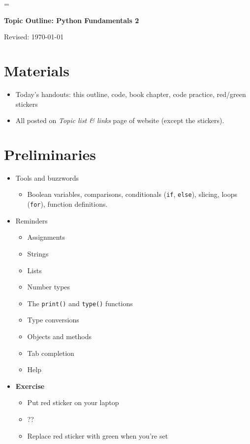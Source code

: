 \documentclass[11pt]{article}
\begin{document}
\parskip=\bigskipamount
\parindent=0.0in
\thispagestyle{empty}


\bigskip\bigskip
\centerline{\Large \bf Topic Outline:  Python Fundamentals 2}
\centerline{Revised: \today}


\section*{Materials}

\begin{itemize}
\item  Today's handouts:  this outline, code, book chapter, code practice, red/green stickers
\item  All posted on {\it Topic list \& links\/} page of website (except the stickers).
\end{itemize}


\section*{Preliminaries}

\begin{itemize}

\item Tools and buzzwords
\begin{itemize}
\item Boolean variables, comparisons, conditionals ({\tt if}, {\tt else}), slicing,
loops ({\tt for}), function definitions.
\end{itemize}

\item Reminders
\begin{itemize}
\item Assignments
\item Strings
\item Lists
\item Number types
\item The {\tt print()} and {\tt type()} functions
\item Type conversions
\item Objects and methods 
\item Tab completion
\item Help 
\end{itemize}

\item {\bf Exercise}
\begin{itemize}
\item Put red sticker on your laptop
\item ??
\item Replace red sticker with green when you're set
\end{itemize}

\end{itemize}
\end{document}

